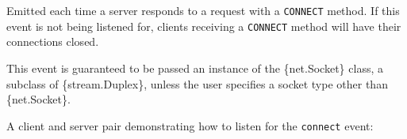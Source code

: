 Emitted each time a server responds to a request with a \texttt{CONNECT}
method. If this event is not being listened for, clients receiving a
\texttt{CONNECT} method will have their connections closed.

This event is guaranteed to be passed an instance of the \{net.Socket\}
class, a subclass of \{stream.Duplex\}, unless the user specifies a
socket type other than \{net.Socket\}.

A client and server pair demonstrating how to listen for the
\texttt{\textquotesingle{}connect\textquotesingle{}} event:

\begin{Shaded}
\begin{Highlighting}[]
\OperatorTok{,} \OperatorTok{;}
 \OperatorTok{;}
 \OperatorTok{;}


\end{Highlighting}
\end{Shaded}
